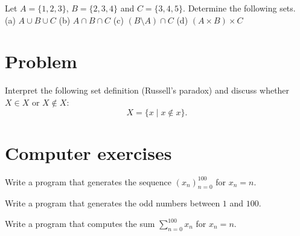 \begin{exercise}
  Let $A = \{1, 2, 3\}$, $B = \{2, 3, 4\}$ and $C = \{3, 4, 5\}$.
  Determine the following sets. \\
  (a) $A \cup B \cup C$ \quad
  (b) $A \cap B \cap C$ \quad
  (c) $(B \setminus A) \cap C$ \quad
  (d) $(A \times B) \times C$
\end{exercise}

\section*{Problem}

\begin{problem}
  Interpret the following set definition (Russell's paradox) and discuss
  whether $X \in X$ or $X \notin X$:
  \begin{equation}
    X = \{x \mid x \notin x\}.
  \end{equation}
\end{problem}

\section*{Computer exercises}

\begin{programming}
  Write a program that generates the sequence $(x_n)_{n=0}^{100}$
  for $x_n = n$.
\end{programming}

\begin{programming}
  Write a program that generates the odd numbers between $1$ and $100$.
\end{programming}

\begin{programming}
  Write a program that computes the sum $\sum_{n=0}^{100} x_n$
  for $x_n = n$.
\end{programming}